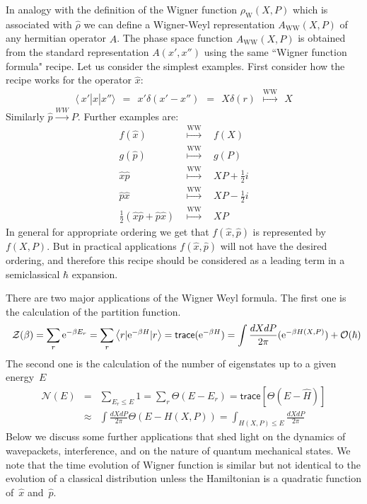 \documentclass[onecolumn,fleqn, 11pt]{revtex4}
\newcommand{\trc}{\mathsf{trace}}
\newcommand{\eexp}{\mathrm{e}^}
\newcommand{\tbox}[1]{\text{#1}}
\newcommand{\beq}{\begin{eqnarray}}
\newcommand{\eeq}{\end{eqnarray}}
\begin{document}
In analogy with the definition of the Wigner function $\rho_{\tbox{W}}(X,P)$ 
which is associated with $\hat{\rho}$ we can define a Wigner-Weyl 
representation $A_{\tbox{WW}}(X,P)$  of any hermitian operator $\hat{A}$.  
The phase space function $A_{\tbox{WW}}(X,P)$ is obtained from 
the standard representation ${A(x',x'')}$ 
using the same ``Wigner function formula" recipe.  
Let us consider the simplest examples.    
First consider how the recipe works for the operator $\hat{x}$:   
\beq
\langle \ x'|\hat{x} |x'' \rangle
\ \ = \ \ 
x'\delta(x'-x'')
\ \ = \ \ X\delta(r)
\ \ \stackrel{\tbox{WW}}{\longmapsto} \ \ X
\eeq
Similarly $\hat{p}\stackrel{WW}{\rightarrow}P$.
Further examples are: 
\beq
f(\hat{x})
& \ \ \stackrel{\tbox{WW}}{\longmapsto} \ \  
& f(X)
\\ 
g(\hat{p})
& \ \ \stackrel{\tbox{WW}}{\longmapsto} \ \  
& g(P)
\\ 
\hat{x}\hat{p} 
& \ \ \stackrel{\tbox{WW}}{\longmapsto} \ \  
& XP +\frac{1}{2}i 
\\ 
 \hat{p}\hat{x} 
& \ \ \stackrel{\tbox{WW}}{\longmapsto} \ \ 
& XP -\frac{1}{2}i 
\\ 
\frac{1}{2}(\hat{x}\hat{p}+\hat{p}\hat{x}) 
& \ \ \stackrel{\tbox{WW}}{\longmapsto} \ \ 
& XP 
\eeq
In general for appropriate ordering we get that $f(\hat{x},\hat{p})$ 
is represented by $f(X,P)$. But in practical applications $f(\hat{x},\hat{p})$  
will not have the desired ordering, and therefore this recipe 
should be considered as a leading term in a semiclassical $\hbar$ expansion. 

There are two major applications of the Wigner Weyl formula. 
The first one is the calculation of the partition function.
\beq
\hspace{2 mm} \mathcal{Z}(\beta)
=\sum_{r}  \eexp{-\beta E_{r}}
= \sum_{r}  \left\langle r | \eexp{-\beta H} |r \right\rangle
=\trc(\eexp{-\beta H})
= \int\frac{dXdP}{2\pi}(\eexp{-\beta H(X,P)}) + \mathcal{O}(\hbar)
\eeq
The second one is the calculation of the number of eigenstates 
up to a given energy~$E$
\beq
\mathcal{N}(E)
&=& \sum_{E_r\leq E}1
=\sum_{r}\Theta(E-E_{r})
=\trc[\Theta(E-\hat{H})]
\\ \nonumber
& \approx & \int\frac{dXdP}
{2\pi}\Theta(E-H(X,P)) 
=\int_{{H(X,P)\leq E}}\frac{dXdP}{2\pi}
\eeq
Below we discuss some further applications
that shed light on the dynamics of 
wavepackets, interference, and on the nature 
of quantum mechanical states. We note that 
the time evolution of Wigner function is 
similar but not identical to the evolution 
of a classical distribution unless the 
Hamiltonian is a quadratic function 
of~$\hat{x}$ and~$\hat{p}$. 
 
\end{document}
